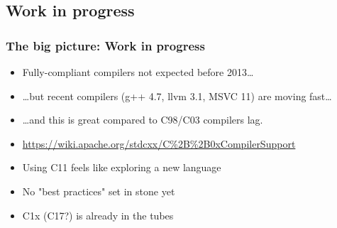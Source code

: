 \documentclass[xcolor=dvipsnames]{beamer}
\newcommand{\CC}{C\nolinebreak\hspace{-.05em}\raisebox{.4ex}{\scriptsize\bf +}\nolinebreak\hspace{-.05em}\raisebox{.4ex}{\scriptsize\bf +}}
\begin{document}
\subsection{Work in progress}
\begin{frame}[fragile]
\frametitle{The big picture: Work in progress}

\begin{itemize}
  \item Fully-compliant compilers not expected before 2013\ldots
  \pause
  \item \ldots but recent compilers (g++ 4.7, llvm 3.1, MSVC 11) are moving fast\ldots
  \pause
  \item \ldots and this is great compared to \CC{}98/\CC{}03 compilers lag.
  \pause
  \item {\footnotesize \url{https://wiki.apache.org/stdcxx/C%2B%2B0xCompilerSupport}}
\end{itemize}

\pause

\begin{itemize}
  \item Using \CC{}11 feels like exploring a new language
  \pause
  \item No "best practices" set in stone yet
  \pause
  \item \CC{}1x (\CC{}17?) is already in the tubes
\end{itemize}
\end{frame}
\end{document}
